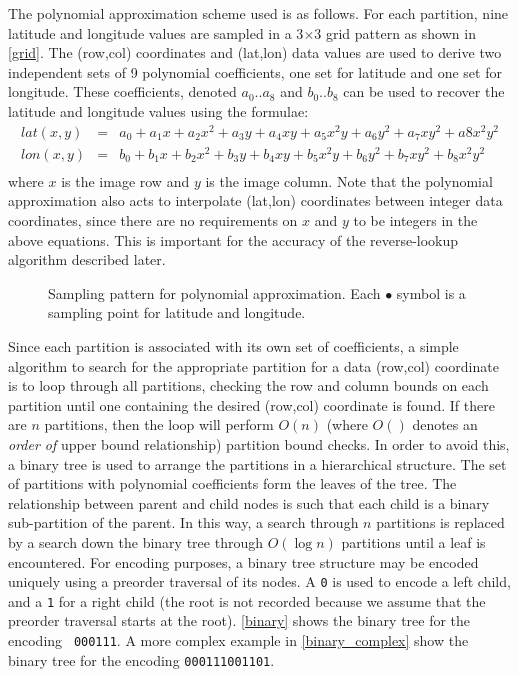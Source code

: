 The polynomial approximation scheme used is as follows. For each
partition, nine latitude and longitude values are sampled in a
3$\times$3 grid pattern as shown in \autoref{grid}.  The (row,col)
coordinates and (lat,lon) data values are used to derive two
independent sets of 9 polynomial coefficients, one set for latitude
and one set for longitude. These coefficients, denoted $a_0 .. a_8$
and $b_0 .. b_8$ can be used to recover the latitude and longitude
values using the formulae:
\begin{eqnarray*}
  lat(x,y) & = & a_0 + a_1 x + a_2 x^2 + 
             a_3 y + a_4 x y + a_5 x^2 y + 
             a_6 y^2 + a_7 x y^2 + a8 x^2 y^2 \\
  lon(x,y) & = & b_0 + b_1 x + b_2 x^2 + 
             b_3 y + b_4 x y + b_5 x^2 y + 
             b_6 y^2 + b_7 x y^2 + b_8 x^2 y^2 \\
\end{eqnarray*}
where $x$ is the image row and $y$ is the image column. Note that the
polynomial approximation also acts to interpolate (lat,lon)
coordinates between integer data coordinates, since there are no
requirements on $x$ and $y$ to be integers in the above equations. This is
important for the accuracy of the reverse-lookup algorithm described
later.

\begin{figure}
  \begin{center}
    \caption[Sampling pattern for polynomial approximation]{
      Sampling pattern for polynomial approximation.  Each $\bullet$
      symbol is a sampling point for latitude and longitude.
    }
    \label{grid}
  \end{center}
\end{figure}

Since each partition is associated with its own set of coefficients, a
simple algorithm to search for the appropriate partition for a data
(row,col) coordinate is to loop through all partitions, checking the
row and column bounds on each partition until one containing the
desired (row,col) coordinate is found. If there are $n$ partitions, then
the loop will perform $O(n)$ (where $O()$ denotes an {\em order of}
upper bound relationship) partition bound checks. In order to avoid
this, a binary tree is used to arrange the partitions in a
hierarchical structure. The set of partitions with polynomial
coefficients form the leaves of the tree. The relationship between
parent and child nodes is such that each child is a binary
sub-partition of the parent. In this way, a search through $n$
partitions is replaced by a search down the binary tree through
$O(\log n)$ partitions until a leaf is encountered. For encoding
purposes, a binary tree structure may be encoded uniquely using a
preorder traversal of its nodes. A {\tt 0} is used to encode a left
child, and a {\tt 1} for a right child (the root is not recorded
because we assume that the preorder traversal starts at the
root). \autoref{binary} shows the binary tree for the encoding {\tt
000111}.  A more complex example in \autoref{binary_complex} show
the binary tree for the encoding {\tt 000111001101}.

